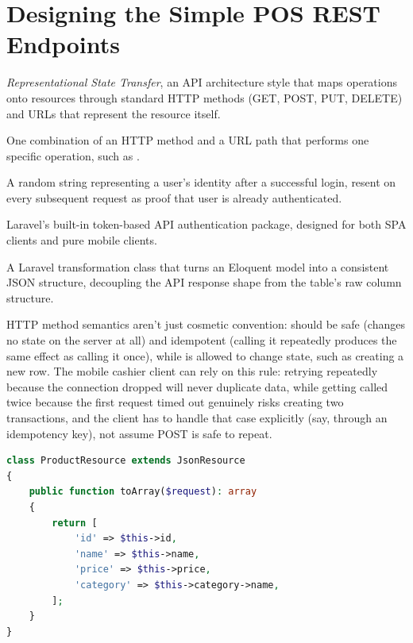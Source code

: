 \section{Designing the Simple POS REST Endpoints}
\label{sec:membangun-rest-api-1}

\begin{istilahpenting}
\begin{description}[leftmargin=0pt,style=nextline]
  \item[REST] \textit{Representational State Transfer}, an API architecture style that maps operations onto resources through standard HTTP methods (GET, POST, PUT, DELETE) and URLs that represent the resource itself.
  \item[Endpoint] One combination of an HTTP method and a URL path that performs one specific operation, such as .
  \item[Token] A random string representing a user's identity after a successful login, resent on every subsequent request as proof that user is already authenticated.
  \item[Sanctum] Laravel's built-in token-based API authentication package, designed for both SPA clients and pure mobile clients.
  \item[API Resource] A Laravel transformation class that turns an Eloquent model into a consistent JSON structure, decoupling the API response shape from the table's raw column structure.
\end{description}
\end{istilahpenting}

HTTP method semantics aren't just cosmetic convention: 
should be safe (changes no state on the server at all) and idempotent
(calling it repeatedly produces the same effect as calling it once),
while  is allowed to change state, such as creating a new
row. The mobile cashier client can rely on this rule: retrying
 repeatedly because the connection dropped
will never duplicate data, while  getting
called twice because the first request timed out genuinely risks
creating two transactions, and the client has to handle that case
explicitly (say, through an idempotency key), not assume POST is safe
to repeat.

\begin{lstlisting}[language=php, title=\lstfile{app/Http/Resources/ProductResource.php}]
class ProductResource extends JsonResource
{
    public function toArray($request): array
    {
        return [
            'id' => $this->id,
            'name' => $this->name,
            'price' => $this->price,
            'category' => $this->category->name,
        ];
    }
}
\end{lstlisting}

